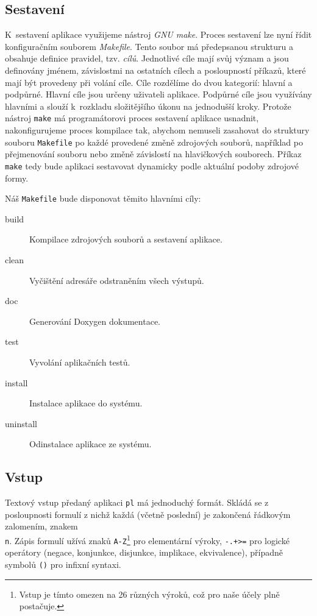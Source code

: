 \documentclass[thesis=B,czech,hidelinks]{FITthesis}[2012/06/26]
\begin{document}
\subsection{Sestavení}

K~sestavení aplikace využijeme nástroj \emph{GNU make}\cite{gmake}. Proces sestavení lze nyní řídit konfiguračním souborem \emph{Makefile}. Tento soubor má předepsanou strukturu a obsahuje definice pravidel, tzv. \emph{cílů}. Jednotlivé cíle mají svůj význam a jsou definovány jménem, závislostmi na ostatních cílech a posloupností příkazů, které mají být provedeny při volání cíle. Cíle rozdělíme do dvou kategorií: hlavní a podpůrné. Hlavní cíle jsou určeny uživateli aplikace. Podpůrné cíle jsou využívány hlavními a slouží k~rozkladu složitějšího úkonu na jednodušší kroky. Protože nástroj \texttt{make} má programátorovi proces sestavení aplikace usnadnit, nakonfigurujeme proces kompilace tak, abychom nemuseli zasahovat do struktury souboru \texttt{Makefile} po každé provedené změně zdrojových souborů, například po přejmenování souboru nebo změně závislostí na hlavičkových souborech. Příkaz \texttt{make} tedy bude aplikaci sestavovat dynamicky podle aktuální podoby zdrojové formy.

Náš \texttt{Makefile} bude disponovat těmito hlavními cíly:

\begin{description}
	\item[build] Kompilace zdrojových souborů a sestavení aplikace.
	\item[clean] Vyčištění adresáře odstraněním všech výstupů.
	\item[doc] Generování Doxygen dokumentace.
	\item[test] Vyvolání aplikačních testů.
	\item[install] Instalace aplikace do systému.
	\item[uninstall] Odinstalace aplikace ze systému.
\end{description}

\subsection{Vstup}

Textový vstup předaný aplikaci \texttt{pl} má jednoduchý formát. Skládá se z posloupnosti formulí z nichž každá (včetně poslední) je zakončená řádkovým zalomením, znakem \texttt{\\n}. Zápis formulí užívá znaků \texttt{A-Z}\footnote{Vstup je tímto omezen na 26 různých výroků, což pro naše účely plně postačuje.} pro elementární výroky, \texttt{-.+>=} pro logické operátory (negace, konjunkce, disjunkce, implikace, ekvivalence), případně symbolů \texttt{()} pro infixní syntaxi.
\end{document}
